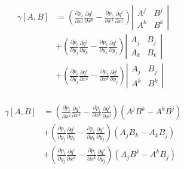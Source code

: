 \documentclass[a4paper,10pt]{article}
\numberwithin{equation}{section}
\begin{document}
\begin{align}
\begin{split}
 \gamma[A,B] &= \left(\frac{\partial p_i}{\partial x^j}\frac{\partial q^i}{\partial x^k} 
 - \frac{\partial p_i}{\partial x^k}\frac{\partial q^i}{\partial x^j}\right)\left|\begin{matrix}
                                                                             A^j & B^j \\
                                                                             A^k & B^k
                                                                            \end{matrix}\right| \\
 &+ \left(\frac{\partial p_i}{\partial y_j}\frac{\partial q^i}{\partial y_k} 
 - \frac{\partial p_i}{\partial y_k}\frac{\partial q^i}{\partial y_j}\right)\left|\begin{matrix}
                                                                             A_j & B_j \\
                                                                             A_k & B_k
                                                                            \end{matrix}\right| \\
 &+ \left(\frac{\partial p_i}{\partial y_j}\frac{\partial q^i}{\partial x^k} 
 - \frac{\partial p_i}{\partial x^k}\frac{\partial q^i}{\partial y_j}\right)\left|\begin{matrix}
                                                                             A_j & B_j \\
                                                                             A^k & B^k
                                                                            \end{matrix}\right|
\end{split}
\end{align}

\begin{align}
\begin{split}
 \gamma[A,B] &= \left(\frac{\partial p_i}{\partial x^j}\frac{\partial q^i}{\partial x^k} 
 - \frac{\partial p_i}{\partial x^k}\frac{\partial q^i}{\partial x^j}\right)(A^jB^k - A^kB^j) \\
 &+ \left(\frac{\partial p_i}{\partial y_j}\frac{\partial q^i}{\partial y_k} 
 - \frac{\partial p_i}{\partial y_k}\frac{\partial q^i}{\partial y_j}\right)(A_jB_k - A_kB_j) \\
 &+  \left(\frac{\partial p_i}{\partial y_j}\frac{\partial q^i}{\partial x^k} 
 - \frac{\partial p_i}{\partial x^k}\frac{\partial q^i}{\partial y_j}\right)(A_jB^k - A^kB_j)
\end{split}
\end{align}
\end{document}
